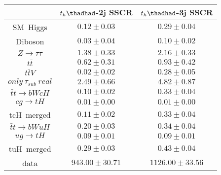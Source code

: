 \centering
\begin{tabular}{ccc} \toprule\toprule
 & $t_{h}\thadhad$-2j SSCR & $t_{h}\thadhad$-3j SSCR \\  \midrule
SM~Higgs & $0.12\pm0.03$ & $0.29\pm0.04$\\
Diboson & $0.03\pm0.04$ & $0.10\pm0.02$\\
$Z\to\tau\tau$ & $1.38\pm0.33$ & $2.16\pm0.33$\\
$t\bar{t}$ & $0.62\pm0.31$ & $0.93\pm0.42$\\
$t\bar{t}V$ & $0.02\pm0.02$ & $0.28\pm0.05$\\
$only~\tau_{sub}~real$ & $2.49\pm0.66$ & $4.82\pm0.87$\\\midrule\midrule
$\bar{t}t\to bWcH$ & $0.10\pm0.02$ & $0.33\pm0.04$\\
$cg\to tH$ & $0.01\pm0.00$ & $0.01\pm0.00$\\ 
tcH~merged & $0.11\pm0.02$ & $0.33\pm0.04$\\\midrule
$\bar{t}t\to bWuH$ & $0.20\pm0.03$ & $0.34\pm0.04$\\
$ug\to tH$ & $0.09\pm0.01$ & $0.09\pm0.01$\\
tuH~merged & $0.29\pm0.03$ & $0.43\pm0.04$\\\midrule\midrule
data & $943.00\pm30.71$ & $1126.00\pm33.56$\\
\bottomrule\bottomrule
\end{tabular}


